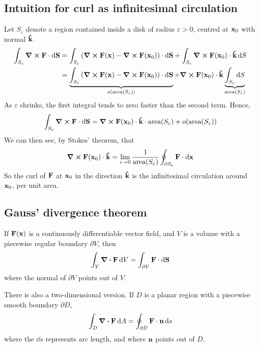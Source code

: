 \subsection{Intuition for curl as infinitesimal circulation}
Let \(S_\varepsilon\) denote a region contained inside a disk of radius \(\varepsilon > 0\), centred at \(\vb x_0\) with normal \(\vu{k}\).
\begin{align*}
	\int_{S_\varepsilon} \curl{\vb F} \cdot \dd{\vb S} & = \int_{S_\varepsilon} \left( \curl{\vb F(\vb x)} - \curl{\vb F(\vb x_0)} \right) \cdot \dd{\vb S} + \int_{S_\varepsilon} \curl{\vb F(\vb x_0)} \cdot \vu k \dd{S}                                                                                        \\
	                                                   & = \underbrace{\int_{S_\varepsilon} \left( \curl{\vb F(\vb x)} - \curl{\vb F(\vb x_0)} \right) \cdot \dd{\vb S}}_{o(\text{area}(S_\varepsilon))} + \curl{\vb F(\vb x_0)} \cdot \vu k \underbrace{\int_{S_\varepsilon} \dd{S}}_{\text{area}(S_\varepsilon)} \\
\end{align*}
As \(\varepsilon\) shrinks, the first integral tends to zero faster than the second term.
Hence,
\[
	\int_{S_\varepsilon} \curl{\vb F} \cdot \dd{\vb S} =  \curl{\vb F(\vb x_0)} \cdot \vu k \cdot \text{area}(S_\varepsilon) + o(\text{area}(S_\varepsilon))
\]
We can then see, by Stokes' theorem, that
\[
	\curl{\vb F(\vb x_0)} \cdot \vu k = \lim_{\varepsilon \to 0} \frac{1}{\text{area}(S_\varepsilon)} \oint_{\partial S_\varepsilon} \vb F \cdot \dd{\vb x}
\]
So the curl of \(\vb F\) at \(\vb x_0\) in the direction \(\vu k\) is the infinitesimal circulation around \(\vb x_0\), per unit area.

\subsection{Gauss' divergence theorem}
\begin{proposition}
	If \(\vb F(\vb x)\) is a continuously differentiable vector field, and \(V\) is a volume with a piecewise regular boundary \(\partial V\), then
	\[
		\int_V \div{\vb F} \dd{V} = \int_{\partial V} \vb F \cdot \dd{\vb S}
	\]
	where the normal of \(\partial V\) points out of \(V\).
\end{proposition}
\noindent There is also a two-dimensional version.
If \(D\) is a planar region with a piecewise smooth boundary \(\partial D\),
\[
	\int_D \div{\vb F} \dd{A} = \oint_{\partial D} \vb F \cdot \vb n \dd{s}
\]
where the \(\dd{s}\) represents arc length, and where \(\vb n\) points out of \(D\).

